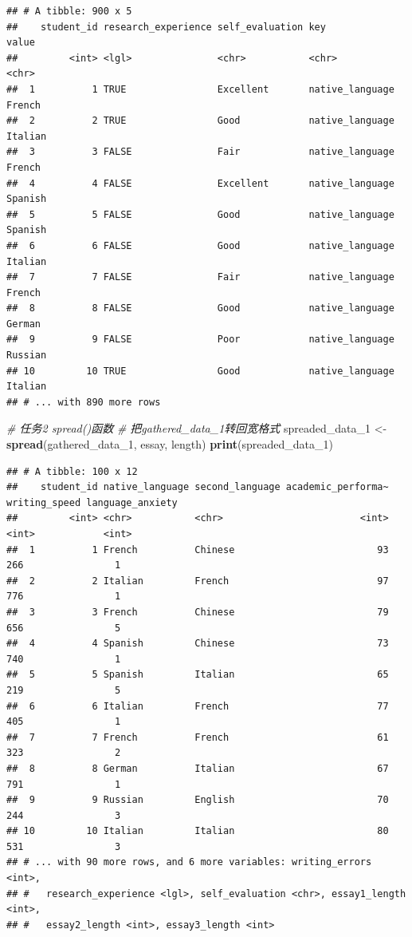 \documentclass[]{book}
\newenvironment{Shaded}{\begin{snugshade}}{\end{snugshade}}
\newcommand{\CommentTok}[1]{\textcolor[rgb]{0.56,0.35,0.01}{\textit{#1}}}
\newcommand{\DecValTok}[1]{\textcolor[rgb]{0.00,0.00,0.81}{#1}}
\newcommand{\KeywordTok}[1]{\textcolor[rgb]{0.13,0.29,0.53}{\textbf{#1}}}
\newcommand{\NormalTok}[1]{#1}
\newcommand{\StringTok}[1]{\textcolor[rgb]{0.31,0.60,0.02}{#1}}
\begin{document}
\begin{verbatim}
## # A tibble: 900 x 5
##    student_id research_experience self_evaluation key             value
##         <int> <lgl>               <chr>           <chr>           <chr>
##  1          1 TRUE                Excellent       native_language French
##  2          2 TRUE                Good            native_language Italian
##  3          3 FALSE               Fair            native_language French
##  4          4 FALSE               Excellent       native_language Spanish
##  5          5 FALSE               Good            native_language Spanish
##  6          6 FALSE               Good            native_language Italian
##  7          7 FALSE               Fair            native_language French
##  8          8 FALSE               Good            native_language German
##  9          9 FALSE               Poor            native_language Russian
## 10         10 TRUE                Good            native_language Italian
## # ... with 890 more rows
\end{verbatim}

\begin{Shaded}
\begin{Highlighting}[]
\CommentTok{# 任务2 spread()函数}
\CommentTok{# 把gathered_data_1转回宽格式}
\NormalTok{spreaded_data_}\DecValTok{1}\NormalTok{ <-}\StringTok{ }\KeywordTok{spread}\NormalTok{(gathered_data_}\DecValTok{1}\NormalTok{, essay, length)}
\KeywordTok{print}\NormalTok{(spreaded_data_}\DecValTok{1}\NormalTok{)}
\end{Highlighting}
\end{Shaded}

\begin{verbatim}
## # A tibble: 100 x 12
##    student_id native_language second_language academic_performa~ writing_speed language_anxiety
##         <int> <chr>           <chr>                        <int>         <int>            <int>
##  1          1 French          Chinese                         93           266                1
##  2          2 Italian         French                          97           776                1
##  3          3 French          Chinese                         79           656                5
##  4          4 Spanish         Chinese                         73           740                1
##  5          5 Spanish         Italian                         65           219                5
##  6          6 Italian         French                          77           405                1
##  7          7 French          French                          61           323                2
##  8          8 German          Italian                         67           791                1
##  9          9 Russian         English                         70           244                3
## 10         10 Italian         Italian                         80           531                3
## # ... with 90 more rows, and 6 more variables: writing_errors <int>,
## #   research_experience <lgl>, self_evaluation <chr>, essay1_length <int>,
## #   essay2_length <int>, essay3_length <int>
\end{verbatim}
\end{document}
